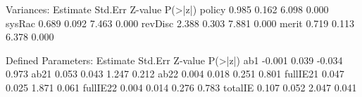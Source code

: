 \begin{Schunk}
\begin{Soutput}
Variances:
                   Estimate  Std.Err  Z-value  P(>|z|)
    policy            0.985    0.162    6.098    0.000
    sysRac            0.689    0.092    7.463    0.000
    revDisc           2.388    0.303    7.881    0.000
    merit             0.719    0.113    6.378    0.000

Defined Parameters:
                   Estimate  Std.Err  Z-value  P(>|z|)
    ab1              -0.001    0.039   -0.034    0.973
    ab21              0.053    0.043    1.247    0.212
    ab22              0.004    0.018    0.251    0.801
    fullIE21          0.047    0.025    1.871    0.061
    fullIE22          0.004    0.014    0.276    0.783
    totalIE           0.107    0.052    2.047    0.041
\end{Soutput}
\end{Schunk}
